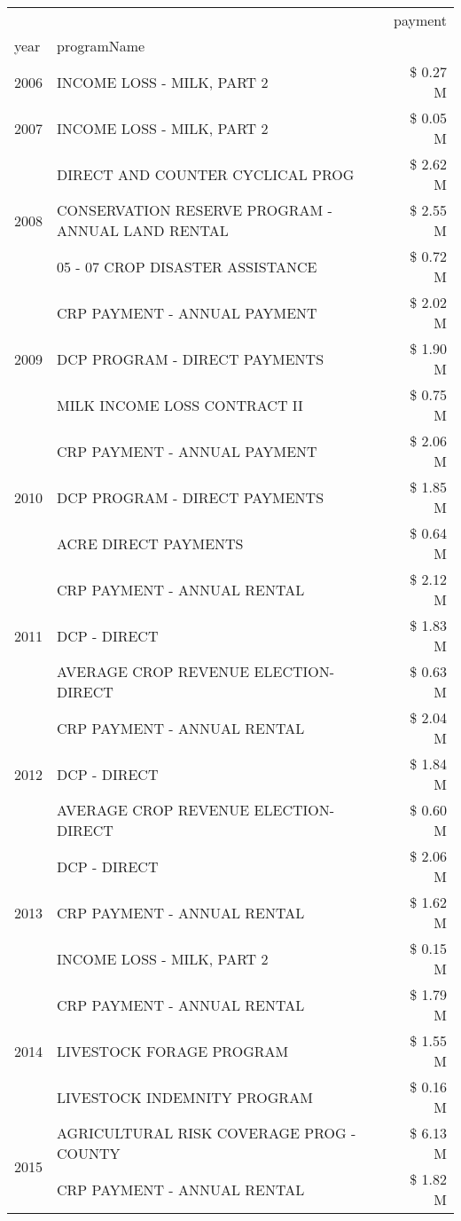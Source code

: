 \begin{tabular}{llr}
\toprule
 &  & payment \\
year & programName &  \\
\midrule
2006 & INCOME LOSS - MILK, PART 2 & \$ 0.27 M \\
\cline{1-3}
2007 & INCOME LOSS - MILK, PART 2 & \$ 0.05 M \\
\cline{1-3}
\multirow[t]{3}{*}{2008} & DIRECT AND COUNTER CYCLICAL PROG & \$ 2.62 M \\
 & CONSERVATION RESERVE PROGRAM - ANNUAL LAND RENTAL & \$ 2.55 M \\
 & 05 - 07 CROP DISASTER ASSISTANCE & \$ 0.72 M \\
\cline{1-3}
\multirow[t]{3}{*}{2009} & CRP PAYMENT - ANNUAL PAYMENT & \$ 2.02 M \\
 & DCP PROGRAM - DIRECT PAYMENTS & \$ 1.90 M \\
 & MILK INCOME LOSS CONTRACT II & \$ 0.75 M \\
\cline{1-3}
\multirow[t]{3}{*}{2010} & CRP PAYMENT - ANNUAL PAYMENT & \$ 2.06 M \\
 & DCP PROGRAM - DIRECT PAYMENTS & \$ 1.85 M \\
 & ACRE DIRECT PAYMENTS & \$ 0.64 M \\
\cline{1-3}
\multirow[t]{3}{*}{2011} & CRP PAYMENT - ANNUAL RENTAL & \$ 2.12 M \\
 & DCP - DIRECT & \$ 1.83 M \\
 & AVERAGE CROP REVENUE ELECTION-DIRECT & \$ 0.63 M \\
\cline{1-3}
\multirow[t]{3}{*}{2012} & CRP PAYMENT - ANNUAL RENTAL & \$ 2.04 M \\
 & DCP - DIRECT & \$ 1.84 M \\
 & AVERAGE CROP REVENUE ELECTION-DIRECT & \$ 0.60 M \\
\cline{1-3}
\multirow[t]{3}{*}{2013} & DCP - DIRECT & \$ 2.06 M \\
 & CRP PAYMENT - ANNUAL RENTAL & \$ 1.62 M \\
 & INCOME LOSS - MILK, PART 2 & \$ 0.15 M \\
\cline{1-3}
\multirow[t]{3}{*}{2014} & CRP PAYMENT - ANNUAL RENTAL & \$ 1.79 M \\
 & LIVESTOCK FORAGE PROGRAM & \$ 1.55 M \\
 & LIVESTOCK INDEMNITY PROGRAM & \$ 0.16 M \\
\cline{1-3}
\multirow[t]{3}{*}{2015} & AGRICULTURAL RISK COVERAGE PROG - COUNTY & \$ 6.13 M \\
 & CRP PAYMENT - ANNUAL RENTAL & \$ 1.82 M \\

\end{tabular}
